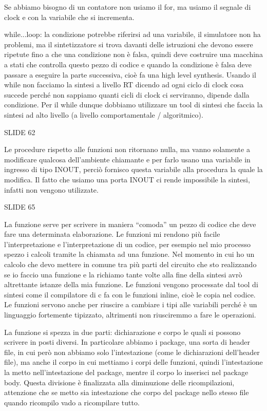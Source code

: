\documentclass[10pt,a4paper,titlepage]{article}
\begin{document}
Se abbiamo bisogno di un contatore non usiamo il for, ma usiamo il segnale di clock e con la variabile che si incrementa.

while...loop: la condizione potrebbe riferirsi ad una variabile, il simulatore non ha problemi, ma il sintetizzatore si trova davanti delle istruzioni che devono essere ripetute fino a che una condizione non è falsa, quindi deve costruire una macchina a stati che controlla questo pezzo di codice e quando la condizione è falsa deve passare a eseguire la parte successiva, cioè fa una high level synthesis. Usando il while non facciamo la sintesi a livello RT dicendo ad ogni ciclo di clock cosa succede perché non sappiamo quanti cicli di clock ci serviranno, dipende dalla condizione. Per il while dunque dobbiamo utilizzare un tool di sintesi che faccia la sintesi ad alto livello (a livello comportamentale / algoritmico). 

SLIDE 62

Le procedure rispetto alle funzioni non ritornano nulla, ma vanno solamente a modificare qualcosa dell’ambiente chiamante e per farlo usano una variabile in ingresso di tipo INOUT, perciò fornisco questa variabile alla procedura la quale la modifica. Il fatto che usiamo una porta INOUT ci rende impossibile la sintesi, infatti non vengono utilizzate.

SLIDE 65 

La funzione serve per scrivere in maniera “comoda” un pezzo di codice che deve fare una determinata elaborazione. Le funzioni mi rendono più facile l’interpretazione e l’interpretazione di un codice, per esempio nel mio processo spezzo i calcoli tramite la chiamata ad una funzione. Nel momento in cui ho un calcolo che devo mettere in comune tra più parti del circuito che sto realizzando se io faccio una funzione e la richiamo tante volte alla fine della sintesi avrò altrettante istanze della mia funzione. Le funzioni vengono processate dal tool di sintesi come il compilatore di c fa con le funzioni inline, cioè le copia nel codice.
Le funzioni servono anche per riuscire a cambiare i tipi alle variabili perché è un linguaggio fortemente tipizzato, altrimenti non riusciremmo a fare le operazioni.

La funzione si spezza in due parti: dichiarazione e corpo le quali si possono scrivere in posti diversi. In particolare abbiamo i package, una sorta di header file, in cui però non abbiamo solo l’intestazione (come le dichiarazioni dell’header file), ma anche il corpo in cui mettiamo i corpi delle funzioni, quindi l’intestazione la metto nell’intestazione del package, mentre il corpo lo inserisci nel package body. Questa divisione è finalizzata alla diminuzione delle ricompilazioni, attenzione che se metto sia intestazione che corpo del package nello stesso file quando ricompilo vado a ricompilare tutto.
\end{document}
